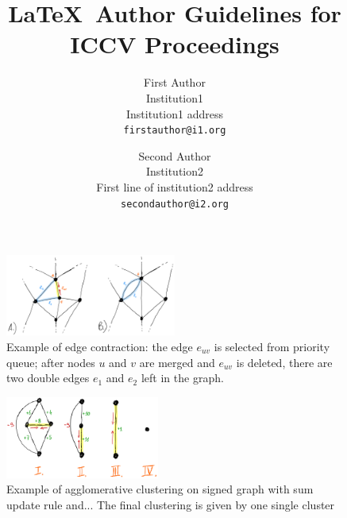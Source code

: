 \documentclass[10pt,twocolumn,letterpaper]{article}
\begin{document}
\title{\LaTeX\ Author Guidelines for ICCV Proceedings}

\author{First Author\\
Institution1\\
Institution1 address\\
{\tt\small firstauthor@i1.org}
\and
Second Author\\
Institution2\\
First line of institution2 address\\
{\tt\small secondauthor@i2.org}
}

\maketitle









\begin{figure}
\centering
\includegraphics[width=0.50\textwidth,trim=0.in 0.in 0.in 0.in,clip]{./figs/edge_contraction.jpeg}
\caption{\small 
Example of edge contraction: the edge $e_{uv}$ is selected from priority queue; after nodes $u$ and $v$ are merged and $e_{uv}$ is deleted, there are two double edges $e_1$ and $e_2$ left in the graph. 
\label{fig:example_non_unique_weights_1}}
\end{figure}

\begin{figure}
\centering
\includegraphics[width=0.45\textwidth,trim=0.in 0.in 0.in 0.in,clip]{./figs/aggl_clust.jpeg}
\caption{\small 
Example of agglomerative clustering on signed graph with sum update rule and... The final clustering is given by one single cluster
\label{fig:example_non_unique_weights_1}}
\end{figure}
\end{document}
